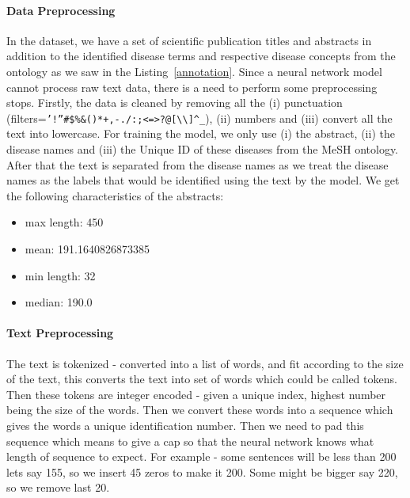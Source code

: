 \paragraph{Data Preprocessing}
In the dataset, we have a set of scientific publication titles and abstracts in addition to the identified disease terms and respective disease concepts from the ontology as we saw in the Listing~\ref{annotation}. 
Since a neural network model cannot process raw text data, there is a need to perform some preprocessing stops.
Firstly, the data is cleaned by removing all the (i) punctuation (filters=\verb|’!”#$%&()*+,-./:;<=>?@[\\]^_|), (ii) numbers and (iii) convert all the text into lowercase.  
For training the model, we only use (i) the abstract, (ii) the disease names and (iii) the Unique ID of these diseases from the MeSH ontology. After that the text is separated from the disease names as we treat the disease names as the labels that would be identified using the text by the model.
We get the following characteristics of the abstracts:
\begin{itemize}
    \item max length:  450
    \item mean:  191.1640826873385
    \item min length:  32
    \item median:  190.0
\end{itemize}
\paragraph{Text Preprocessing} The text is tokenized - converted into a list of words, and fit according to the size of the text, this converts the text into set of words which could be called tokens.
Then these tokens are integer encoded - given a unique index, highest number being the size of the words. 
Then we convert these words into a sequence which gives the words a unique identification number. Then we need to pad this sequence which means to give a cap so that the neural network knows what length of sequence to expect. For example - some sentences will be less than 200 lets say 155, so we insert 45 zeros to make it 200. Some might be bigger say 220, so we remove last 20. 


